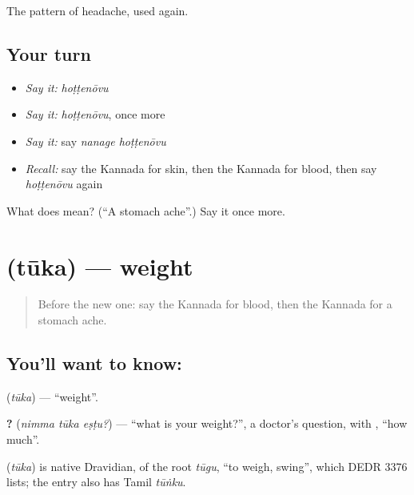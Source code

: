 \begin{grammarlens}[title={What you've built}]
The pattern of headache, used again.
\end{grammarlens}

\subsection*{Your turn}
\begin{itemize}
\raggedright
  \item \emph{Say it:} \emph{hoṭṭenōvu}
  \item \emph{Say it:} \emph{hoṭṭenōvu}, once more
  \item \emph{Say it:} say \emph{nanage hoṭṭenōvu}
  \item \emph{Recall:} say the Kannada for skin, then the Kannada for blood, then say \emph{hoṭṭenōvu} again
\end{itemize}

\begin{tcolorbox}[breakable,colback=teal!4,colframe=teal!35!black,title={Before you move on}]
What does  mean? (\textquotedblleft{}A stomach ache\textquotedblright{}.) Say it once more.
\end{tcolorbox}
\section[\texorpdfstring{\kn{ತೂಕ} (tūka)}{ತೂಕ (tūka)}]{ (tūka) — weight}

\label{lesson:KA-C99-weight}



\begin{quote}
Before the new one: say the Kannada for blood, then the Kannada for a stomach ache.
\end{quote}

\subsection*{You'll want to know: }
\textbf{} (\emph{tūka}) — \textquotedblleft{}weight\textquotedblright{}.

\textbf{  ?} (\emph{nimma tūka eṣṭu?}) — \textquotedblleft{}what is your weight?\textquotedblright{}, a doctor's question, with \textbf{}, \textquotedblleft{}how much\textquotedblright{}.

\begin{cousinweb}
\textbf{} (\emph{tūka}) is native Dravidian, of the root \emph{tūgu}, \textquotedblleft{}to weigh, swing\textquotedblright{}, which DEDR 3376 lists; the entry also has Tamil \emph{tūṅku}.
\end{cousinweb}

